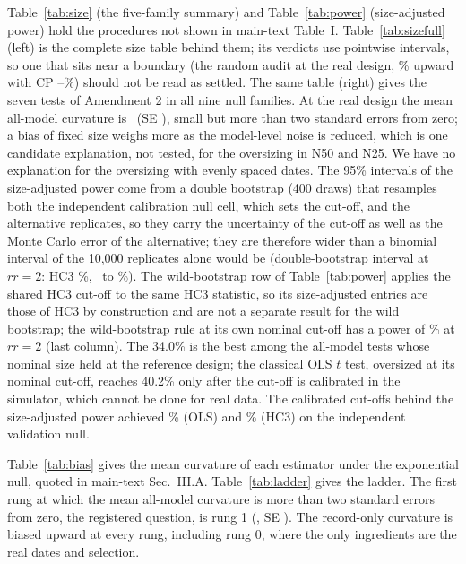 \documentclass[aps,pre,twocolumn,superscriptaddress,nofootinbib,9pt]{revtex4-2}
\newcommand{\rr}{rr}
\begin{document}
Table~\ref{tab:size} (the five-family summary) and Table~\ref{tab:power} (size-adjusted power) hold the procedures not shown in main-text Table~I. Table~\ref{tab:sizefull} (left) is the complete size table behind them; its verdicts use pointwise intervals, so one that sits near a boundary (the random audit at the real design, \sizeAuditUp\% upward with CP \sizeAuditUpLo--\sizeAuditUpHi\%) should not be read as settled. The same table (right) gives the seven tests of Amendment 2 in all nine null families. At the real design the mean all-model curvature is \aTwoRAll\ (SE \aTwoRAllSe), small but more than two standard errors from zero; a bias of fixed size weighs more as the model-level noise is reduced, which is one candidate explanation, not tested, for the oversizing in N50 and N25. We have no explanation for the oversizing with evenly spaced dates. The 95\% intervals of the size-adjusted power come from a double bootstrap (400 draws) that resamples both the independent calibration null cell, which sets the cut-off, and the alternative replicates, so they carry the uncertainty of the cut-off as well as the Monte Carlo error of the alternative; they are therefore wider than a binomial interval of the 10{,}000 replicates alone would be (double-bootstrap interval at $\rr=2$: HC3 \aTwoPowHcTwo\%, \aTwoPowHcTwoLo\ to \aTwoPowHcTwoHi\%). The wild-bootstrap row of Table~\ref{tab:power} applies the shared HC3 cut-off to the same HC3 statistic, so its size-adjusted entries are those of HC3 by construction and are not a separate result for the wild bootstrap; the wild-bootstrap rule at its own nominal cut-off has a power of \aTwoRawWildTwo\% at $\rr=2$ (last column). The 34.0\% is the best among the all-model tests whose nominal size held at the reference design; the classical OLS $t$ test, oversized at its nominal cut-off, reaches 40.2\% only after the cut-off is calibrated in the simulator, which cannot be done for real data. The calibrated cut-offs behind the size-adjusted power achieved \aTwoValOls\% (OLS) and \aTwoValHc\% (HC3) on the independent validation null.

Table~\ref{tab:bias} gives the mean curvature of each estimator under the exponential null, quoted in main-text Sec.~III.A. Table~\ref{tab:ladder} gives the ladder. The first rung at which the mean all-model curvature is more than two standard errors from zero, the registered question, is rung 1 (\ladOneAll, SE \ladOneSe). The record-only curvature is biased upward at every rung, including rung 0, where the only ingredients are the real dates and selection.
\end{document}
